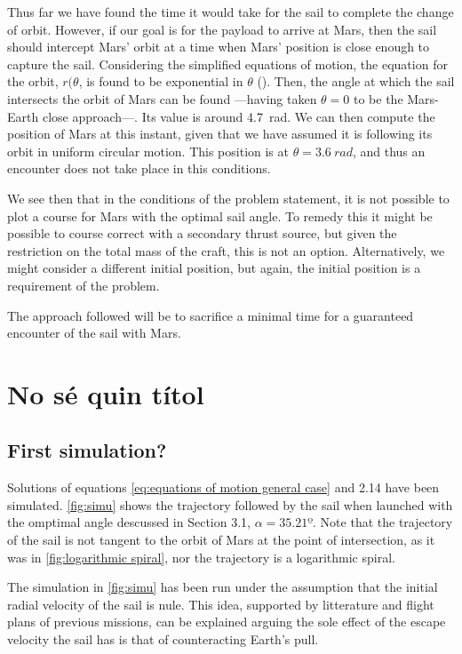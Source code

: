 \documentclass[twocolumn,12pt,a4paper]{article}
\numberwithin{equation}{section}
\begin{document}
Thus far we have found the time it would take for the sail to complete the change of orbit. However, if our goal is for the payload to arrive at Mars, then the sail should intercept Mars' orbit at a time when Mars' position is close enough to capture the sail. Considering the simplified equations of motion, the equation for the orbit, \( r(\theta \), is found to be exponential in \( \theta \) (\cite[p. 155]{mcinnes}). Then, the angle at which the sail intersects the orbit of Mars can be found ---having taken \( \theta = 0	\) to be the Mars-Earth close approach---. Its value is around \SI{4.7}{rad}. We can then compute the position of Mars at this instant, given that we have assumed it is following its orbit in uniform circular motion. This position is at \( \theta = \SI{3.6}{rad} \), and thus an encounter does not take place in this conditions.

We see then that in the conditions of the problem statement, it is not possible to plot a course for Mars with the optimal sail angle. To remedy this it might be possible to course correct with a secondary thrust source, but given the restriction on the total mass of the craft, this is not an option. Alternatively, we might consider a different initial position, but again, the initial position is a requirement of the problem.

The approach followed will be to sacrifice a minimal time for a guaranteed encounter of the sail with Mars.

\section{No sé quin títol}
\subsection{First simulation?}
Solutions of equations \ref{eq:equations of motion general case} and 2.14 have been simulated. \autoref{fig:simu} shows the trajectory followed by the sail when launched with the omptimal angle descussed in Section 3.1, $\alpha=35.21º$. Note that the trajectory of the sail is not tangent to the orbit of Mars at the point of intersection, as it was in \autoref{fig:logarithmic spiral}, nor the trajectory is a logarithmic spiral.

The simulation in  \autoref{fig:simu} has been run under the assumption that the initial radial velocity of the sail is nule. This idea, supported by litterature and flight plans of previous missions, can be explained arguing the sole effect of the escape velocity the sail has is that of counteracting Earth's pull.
\end{document}
